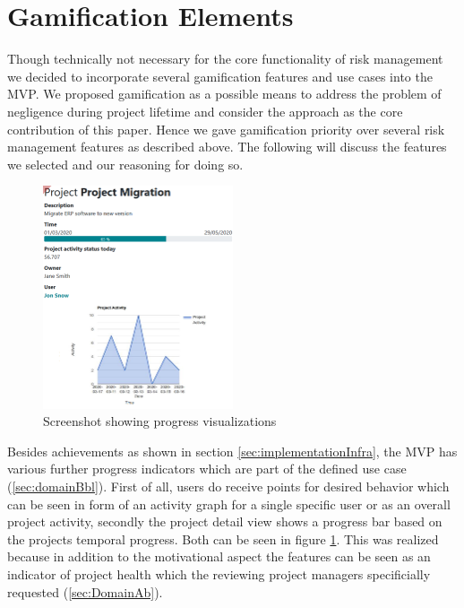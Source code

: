 
\section{Gamification Elements}
\label{sec:implementationGami}

Though technically not necessary for the core functionality of risk management we decided to incorporate several gamification features and use cases into the \ac{MVP}. We proposed gamification as a possible means to address the problem of negligence during project lifetime and consider the approach as the core contribution of this paper. Hence we gave gamification priority over several risk management features as described above. The following will discuss the features we selected and our reasoning for doing so.

\begin{figure}
	\includegraphics[width=0.5\textwidth]{Assets/implementation_shots/projectdetail.png}
	\caption{Screenshot showing progress visualizations}
	\label{fig:projectdetail}
\end{figure}

Besides achievements as shown in section \ref{sec:implementationInfra}, the \ac{MVP} has various further progress indicators which are part of the defined use case (\ref{sec:domainBbl}). First of all, users do receive points for desired behavior which can be seen in form of an activity graph for a single specific user or as an overall project activity, secondly the project detail view shows a progress bar based on the projects temporal progress. Both can be seen in figure \ref{fig:projectdetail}. This was realized because in addition to the motivational aspect the features can be seen as an indicator of project health which the reviewing project managers specificially requested (\ref{sec:DomainAb}).

